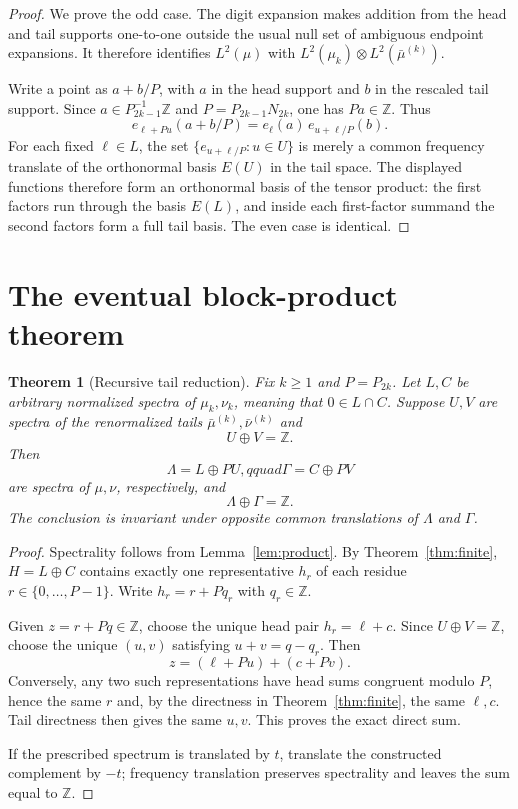\documentclass[11pt]{article}
\newtheorem{theorem}{Theorem}
\newcommand{\Z}{\mathbb Z}
\begin{document}
\begin{proof}
We prove the odd case.  The digit expansion makes addition from the head and
tail supports one-to-one outside the usual null set of ambiguous endpoint
expansions.  It therefore identifies $L^2(\mu)$ with
$L^2(\mu_k)\otimes L^2(\bar\mu^{(k)})$.

Write a point as $a+b/P$, with $a$ in the head support and $b$ in the
rescaled tail support.  Since $a\in P_{2k-1}^{-1}\Z$ and
$P=P_{2k-1}N_{2k}$, one has $Pa\in\Z$.  Thus
\[
 e_{\ell+Pu}(a+b/P)
   =e_\ell(a)\,e_{u+\ell/P}(b).
\]
For each fixed $\ell\in L$, the set
$\{e_{u+\ell/P}:u\in U\}$ is merely a common frequency translate of the
orthonormal basis $E(U)$ in the tail space.  The displayed functions therefore
form an orthonormal basis of the tensor product: the first factors run through
the basis $E(L)$, and inside each first-factor summand the second factors form
a full tail basis.  The even case is identical.
\end{proof}

\section{The eventual block-product theorem}

\begin{theorem}[Recursive tail reduction]\label{thm:tail}
Fix $k\geq1$ and $P=P_{2k}$.  Let $L,C$ be arbitrary normalized spectra of
$\mu_k,\nu_k$, meaning that $0\in L\cap C$.
Suppose $U,V$ are spectra of the renormalized tails
$\bar\mu^{(k)},\bar\nu^{(k)}$ and
\[
 U\oplus V=\Z.
\]
Then
\[
 \Lambda=L\oplus PU,qquad \Gamma=C\oplus PV
\]
are spectra of $\mu,\nu$, respectively, and
\[
 \Lambda\oplus\Gamma=\Z.
\]
The conclusion is invariant under opposite common translations of
$\Lambda$ and $\Gamma$.
\end{theorem}

\begin{proof}
Spectrality follows from Lemma~\ref{lem:product}.  By
Theorem~\ref{thm:finite}, $H=L\oplus C$ contains exactly one representative
$h_r$ of each residue $r\in\{0,\ldots,P-1\}$.  Write
$h_r=r+Pq_r$ with $q_r\in\Z$.

Given $z=r+Pq\in\Z$, choose the unique head pair
$h_r=\ell+c$.  Since $U\oplus V=\Z$, choose the unique $(u,v)$ satisfying
$u+v=q-q_r$.  Then
\[
 z=(\ell+Pu)+(c+Pv).
\]
Conversely, any two such representations have head sums congruent modulo
$P$, hence the same $r$ and, by the directness in
Theorem~\ref{thm:finite}, the same $\ell,c$.  Tail directness then gives the
same $u,v$.  This proves the exact direct sum.

If the prescribed spectrum is translated by $t$, translate the constructed
complement by $-t$; frequency translation preserves spectrality and leaves
the sum equal to $\Z$.
\end{proof}
\end{document}
